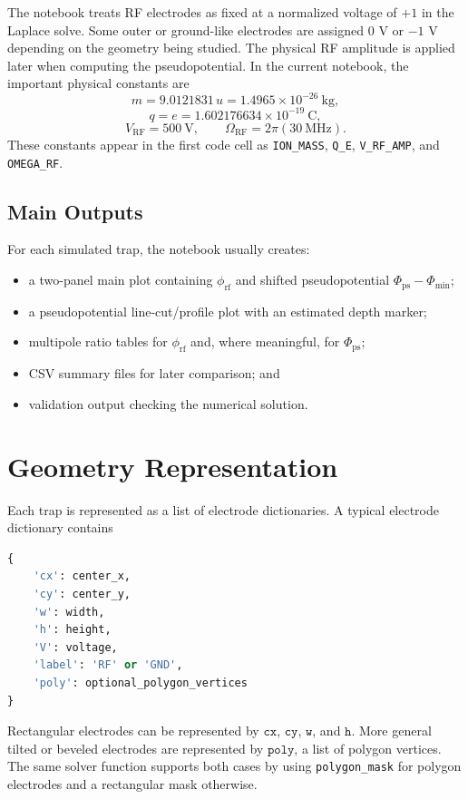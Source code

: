 \documentclass[11pt]{article}
\begin{document}
The notebook treats RF electrodes as fixed at a normalized voltage of \(+1\) in
the Laplace solve. Some outer or ground-like electrodes are assigned \(0\) V or
\(-1\) V depending on the geometry being studied. The physical RF amplitude is
applied later when computing the pseudopotential. In the current notebook, the
important physical constants are
\[
  m = 9.0121831\,u = 1.4965\times 10^{-26}\ \mathrm{kg},
\]
\[
  q = e = 1.602176634\times 10^{-19}\ \mathrm{C},
\]
\[
  V_{\mathrm{RF}} = 500\ \mathrm{V}, \qquad
  \Omega_{\mathrm{RF}} = 2\pi(30\ \mathrm{MHz}).
\]
These constants appear in the first code cell as \texttt{ION\_MASS},
\texttt{Q\_E}, \texttt{V\_RF\_AMP}, and \texttt{OMEGA\_RF}.

\subsection{Main Outputs}

For each simulated trap, the notebook usually creates:
\begin{itemize}
  \item a two-panel main plot containing \(\phi_{\mathrm{rf}}\) and shifted
        pseudopotential \(\Phi_{\mathrm{ps}}-\Phi_{\min}\);
  \item a pseudopotential line-cut/profile plot with an estimated depth marker;
  \item multipole ratio tables for \(\phi_{\mathrm{rf}}\) and, where
        meaningful, for \(\Phi_{\mathrm{ps}}\);
  \item CSV summary files for later comparison; and
  \item validation output checking the numerical solution.
\end{itemize}

\newpage

\section{Geometry Representation}

Each trap is represented as a list of electrode dictionaries. A typical
electrode dictionary contains
\begin{lstlisting}[language=Python]
{
    'cx': center_x,
    'cy': center_y,
    'w': width,
    'h': height,
    'V': voltage,
    'label': 'RF' or 'GND',
    'poly': optional_polygon_vertices
}
\end{lstlisting}
Rectangular electrodes can be represented by \(\texttt{cx}\), \(\texttt{cy}\),
\(\texttt{w}\), and \(\texttt{h}\). More general tilted or beveled electrodes
are represented by \(\texttt{poly}\), a list of polygon vertices. The same
solver function supports both cases by using \texttt{polygon\_mask} for polygon
electrodes and a rectangular mask otherwise.
\end{document}
